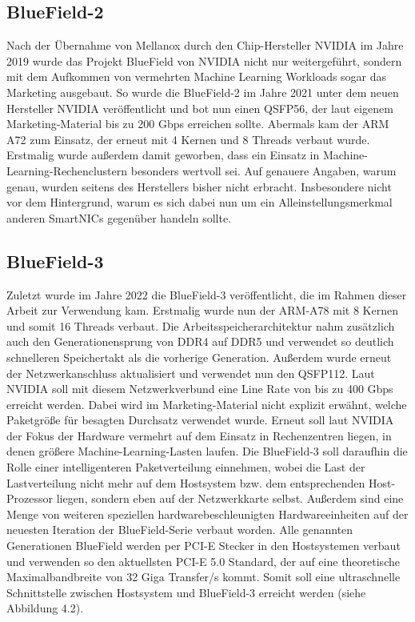 \subsection{BlueField-2}
Nach der Übernahme von Mellanox durch den Chip-Hersteller NVIDIA im Jahre 2019 wurde das Projekt BlueField von NVIDIA nicht nur weitergeführt, sondern mit dem Aufkommen von vermehrten Machine Learning Workloads sogar das Marketing ausgebaut. So wurde die BlueField-2 im Jahre 2021 unter dem neuen Hersteller NVIDIA veröffentlicht und bot nun einen QSFP56, der laut eigenem Marketing-Material bis zu 200 Gbps erreichen sollte. Abermals kam der ARM A72 zum Einsatz, der erneut mit 4 Kernen und 8 Threads verbaut wurde. \cite{bluefieldhistory} Erstmalig wurde außerdem damit geworben, dass ein Einsatz in Machine-Learning-Rechenclustern besonders wertvoll sei. Auf genauere Angaben, warum genau, wurden seitens des Herstellers bisher nicht erbracht. Insbesondere nicht vor dem Hintergrund, warum es sich dabei nun um ein Alleinstellungsmerkmal anderen SmartNICs gegenüber handeln sollte.
\subsection{BlueField-3}
Zuletzt wurde im Jahre 2022 die BlueField-3 veröffentlicht, die im Rahmen dieser Arbeit zur Verwendung kam. Erstmalig wurde nun der ARM-A78 mit 8 Kernen und somit 16 Threads verbaut. Die Arbeitsspeicherarchitektur nahm zusätzlich auch den Generationensprung von DDR4 auf DDR5 und verwendet so deutlich schnelleren Speichertakt als die vorherige Generation. Außerdem wurde erneut der Netzwerkanschluss aktualisiert und verwendet nun den QSFP112. Laut NVIDIA soll mit diesem Netzwerkverbund eine Line Rate von bis zu 400 Gbps erreicht werden. \cite{battle} Dabei wird im Marketing-Material nicht explizit erwähnt, welche Paketgröße für besagten Durchsatz verwendet wurde. Erneut soll laut NVIDIA der Fokus der Hardware vermehrt auf dem Einsatz in Rechenzentren liegen, in denen größere Machine-Learning-Lasten laufen. Die BlueField-3 soll daraufhin die Rolle einer intelligenteren Paketverteilung einnehmen, wobei die Last der Lastverteilung nicht mehr auf dem Hostsystem bzw. dem entsprechenden Host-Prozessor liegen, sondern eben auf der Netzwerkkarte selbst. Außerdem sind eine Menge von weiteren speziellen hardwarebeschleunigten Hardwareeinheiten auf der neuesten Iteration der BlueField-Serie verbaut worden. Alle genannten Generationen BlueField werden per PCI-E Stecker in den Hostsystemen verbaut und verwenden so den aktuellsten PCI-E 5.0 Standard, der auf eine theoretische Maximalbandbreite von 32 Giga Transfer/s kommt. Somit soll eine ultraschnelle Schnittstelle zwischen Hostsystem und BlueField-3 erreicht werden (siehe Abbildung 4.2).
